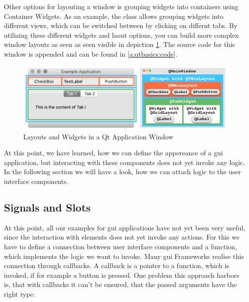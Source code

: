 Other options for layouting a window is grouping widgets into containers using Container Widgets. As an example, the class  allows grouping widgets into different views, which can be switched between by clicking on differnt tabs. By utilizing these different widgets and laout options, you can build more complex window layouts as seen as seen visible in depiction \ref{fig:qtExample}. The source code for this window is appended and can be found in \ref{a:qtbasics:code}.
\cite{PythonGui1}

\begin{figure}[h]
    \centering
    \includegraphics[width=15cm]{resources/img/QtExample}
    \caption{Layouts and Widgets in a Qt Application Window}
    \label{fig:qtExample}
\end{figure}

At this point, we have learned, how we can define the appereance of a \gls{gui} application, but interacting with these components does not yet invoke any logic. In the following section we will have a look, how we can attach logic to the user interface components.





\subsection{Signals and Slots}
\label{sec:fundamentals:qt:signalsslots}

At this point, all our examples for \gls{gui} applications have not yet been very useful, since the interaction with elements does not yet invoke any actions. For this we have to define a connection between user interface components and a function, which implements the logic we want to invoke. Many \gls{gui} Frameworks realise this connection through callbacks. A callback is a pointer to a function, which is invoked, if for example a button is pressed. One problem this approach harbors is, that with callbacks it can't be ensured, that the passed arguments have the right type.


